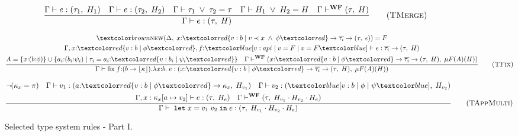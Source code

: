 \begin{figure}[H]
    \begin{equation}
        \frac{
            \Gamma \vdash e : (\tau_1, \; H_1) \quad \Gamma \vdash e : (\tau_2, \; H_2) \quad \Gamma \vdash \tau_1 \;\lor\; \tau_2 = \tau \quad \Gamma \vdash H_1 \;\lor\; H_2 = H \quad \Gamma \vdash^{\textbf{WF}} (\tau, \; H)
        }{
            \Gamma \vdash e : (\tau, \; H)
        }
        \tag{\textsc{TMerge}}
        \label{eq:tmerge}
    \end{equation}

    \begin{equation}
        \frac{
            \begin{gathered}
                \nextd(\Delta, \;x{:}\overa{v: b \;|\; v \prec x \;\land\; \phi} \rightarrow \overline{\tau_i} \rightarrow (\tau, \;\epsilon)) = F \\
                \Gamma, x{:}\overa{v: b \;|\; \phi}, f{:}\under{v: api \;|\; v = F \;|\; v = F} \vdash e : \overline{\tau_i} \rightarrow (\tau, \;H) \\
                A = \{x{:}(b{:}\phi)\} \cup \{a_i{:}(b_i{:}\psi_i) \;|\; \tau_i = a_i{:}\overa{v: b_i \;|\; \psi_i}\} \quad \Gamma \vdash^{\textbf{WF}} (x{:}\overa{v: b \;|\; \phi} \rightarrow \overline{\tau_i} \rightarrow (\tau, \;H), \;\mu F(A)(H))
            \end{gathered}
        }{
            \Gamma \vdash \text{fix}\;f{:}(b \rightarrow \lfloor\kappa\rfloor).\lambda x{:}b.\;e : (x{:}\overa{v: b \;|\; \phi} \rightarrow \overline{\tau_i} \rightarrow (\tau, \;H), \;\mu F(A)(H))
        }
        \tag{\textsc{TFix}}
        \label{eq:tfix}
    \end{equation}

    \begin{equation}
        \frac{
            \begin{gathered}
                \neg(\kappa_x = \pi)
                \quad \Gamma \vdash v_1: (a{:}\overa{v: b \;|\; \phi} \rightarrow \kappa_x, \; H_{v_1}) \quad \Gamma \vdash v_2: (\under{v: b \;|\; \phi \;|\; \psi}, \; H_{v_2}) \\
                \Gamma, x : \kappa_x[a \mapsto v_2] \vdash e: (\tau, \; H_e) \quad \Gamma \vdash^{\textbf{WF}} (\tau, \; H_{v_1} \cdot H_{v_2} \cdot H_e) \\
            \end{gathered}
        }{
            \Gamma \vdash \;\texttt{let}\; x = v_1 \; v_2 \;\texttt{in}\; e: (\tau, \; H_{v_1} \cdot H_{v_2} \cdot H_e)
        }
        \tag{\textsc{TAppMulti}}
        \label{eq:tappmulti}
    \end{equation}
    \caption{Selected type system rules - Part I.}
    \label{fig:type-system-1}
\end{figure}

